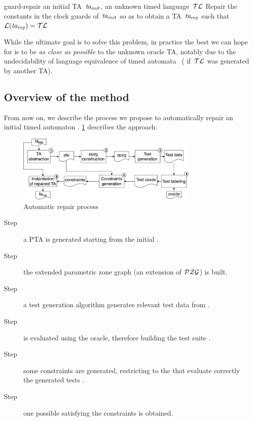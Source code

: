 \begin{tikzborder}{\cite{Gargantini16:validation}}
\begin{tikzborder}{\cite{gargantini_combinatorial_2017}}
\begin{tikzborder}{\cite{gargantini_combinatorial_2017}}
\begin{tikzborder}{\cite{garn2019}}
\begin{tikzborder}{\cite{arcaini2019achieving}}
\begin{tikzborder}{\cite{arcaini2019varivolution}}
{guard-repair}
{an initial TA~$\mathit{ta_{init}}$, an unknown timed language~$\mathcal{TL}$}
{Repair the constants in the clock guards of~$\mathit{ta_{init}}$ so as to obtain a TA~$\mathit{ta_{rep}}$ such that $\mathcal{L}(\mathit{ta_{rep}}) = \mathcal{TL}$}

While the ultimate goal is to solve this problem, in practice the best we can hope for is to be \emph{as close as possible} to the unknown oracle TA, notably due to the undecidability of language equivalence of timed automata~\cite{AD94} (\eg{} if~$\mathcal{TL}$ was generated by another TA).
\be

\subsection{Overview of the method}

\begin{tikzborder}{}
From now on, we describe the process we propose to automatically repair an initial timed automaton \initTa.
\ref{fig:repairProcess} describes the approach:
\end{tikzborder}
\begin{figure}[!htb]
	\centering
	\includegraphics[width=0.8\textwidth]{images/repairProcess-oneShot}
	\caption{Automatic repair process}
	\label{fig:repairProcess}
\end{figure}
%
\begin{description}
	\item[Step ] a PTA \ptaProc is generated starting from the initial \ta \initTa.
	\item[Step ] the extended parametric zone graph \epzg (an extension of $\mathcal{PZG}$) is built.
	\item[Step ] a test generation algorithm generates relevant test data \testData from \epzg.
	\item[Step ] \testData is evaluated using the oracle, therefore building the test suite \testSuiteTA.
	\item[Step ] some constraints \ptaConstr are generated, restricting \ptaProc to the \tas that evaluate correctly the generated tests \testSuiteTA.
	\item[Step ] one possible \ta satisfying the constraints \ptaConstr is obtained.
\end{description}


\end{tikzborder}
\end{tikzborder}
\end{tikzborder}
\end{tikzborder}
\end{tikzborder}
\end{tikzborder}
